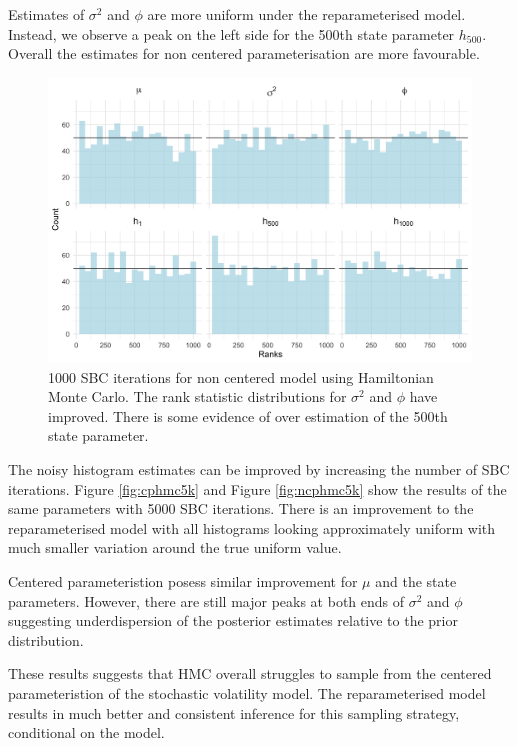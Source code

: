 \documentclass[12pt, a4paper]{article}
\begin{document}
    Estimates of $\sigma^2$ and $\phi$ are more uniform under the reparameterised model. Instead, we observe a peak on the left side for the 500th state parameter $h_{500}$. Overall the estimates for non centered parameterisation are more favourable. 

    \begin{figure}[H]
        \centering
        \includegraphics[scale=0.09]{results/hmc_ncp_1k.png}
        \caption{1000 SBC iterations for non centered model using Hamiltonian Monte Carlo. The rank statistic distributions for $\sigma^2$ and $\phi$ have improved. There is some evidence of over estimation of the 500th state parameter.}
        \label{fig:ncphmc1k}
    \end{figure}

    The noisy histogram estimates can be improved by increasing the number of SBC iterations. Figure \ref{fig:cphmc5k} and Figure \ref{fig:ncphmc5k} show the results of the same parameters with 5000 SBC iterations. There is an improvement to the reparameterised model with all histograms looking approximately uniform with much smaller variation around the true uniform value. 
    
    Centered parameteristion posess similar improvement for $\mu$ and the state parameters. However, there are still major peaks at both ends of $\sigma^2$ and $\phi$ suggesting underdispersion of the posterior estimates relative to the prior distribution.

    These results suggests that HMC overall struggles to sample from the centered parameteristion of the stochastic volatility model. The reparameterised model results in much better and consistent inference for this sampling strategy, conditional on the model. 
\end{document}
